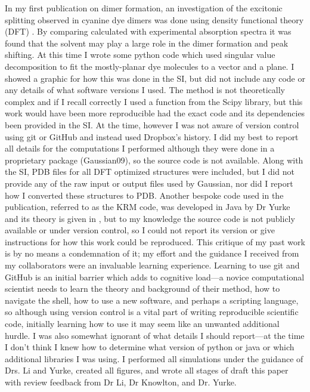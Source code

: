 In my first publication on dimer formation, an investigation of the excitonic splitting observed in cyanine dye dimers was done using density functional theory (DFT) \cite{Fothergill2018}.
By comparing calculated with experimental absorption spectra it was found that the solvent may play a large role in the dimer formation and peak shifting.
At this time I wrote some python code which used singular value decomposition to fit the mostly-planar dye molecules to a vector and a plane. 
I showed a graphic for how this was done in the SI, but did not include any code or any details of what software versions I used. 
The method is not theoretically complex and if I recall correctly I used a function from the Scipy library, but this work would have been more reproducible had the exact code and its dependencies been provided in the SI.
At the time, however I was not aware of version control using git or GitHub and instead used Dropbox's history.
I did my best to report all details for the computations I performed although they were done in a proprietary package (Gaussian09), so the source code is not available.
Along with the SI, PDB files for all DFT optimized structures were included, but I did not provide any of the raw input or output files used by Gaussian, nor did I report how I converted these structures to PDB.
Another bespoke code used in the publication, referred to as the KRM code, was developed in Java by Dr Yurke and its theory is given in \citet[Supporting Information]{Cannon2017}, but to my knowledge the source code is not publicly available or under version control, so I could not report its version or give instructions for how this work could be reproduced.
This critique of my past work is by no means a condemnation of it; my effort and the guidance I received from my collaborators were an invaluable learning experience.
Learning to use git and GitHub is an initial barrier which adds to cognitive load---a novice computational scientist needs to learn the theory and background of their method, how to navigate the shell, how to use a new software, and perhaps a scripting language, so although using version control is a vital part of writing reproducible scientific code, initially learning how to use it may seem like an unwanted additional hurdle.
I was also somewhat ignorant of what details I should report---at the time I don't think I knew how to determine what version of python or java or which additional libraries I was using.
I performed all simulations under the guidance of Drs. Li and Yurke, created all figures, and wrote all stages of draft this paper with review feedback from Dr Li, Dr Knowlton, and Dr. Yurke.

